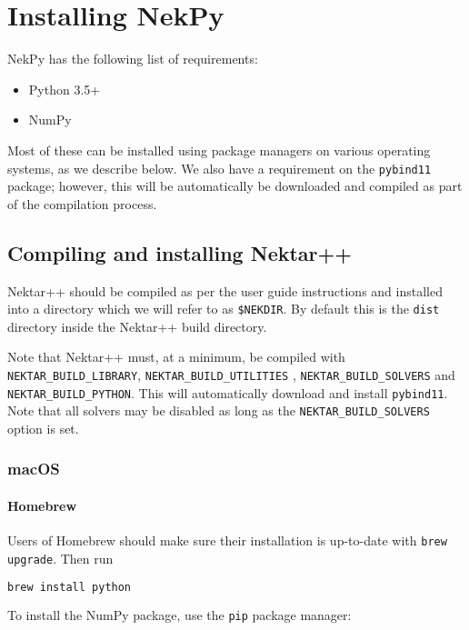 \chapter{Installing NekPy}

NekPy has the following list of requirements:

\begin{itemize}
  \item Python 3.5+
  \item NumPy
\end{itemize}

Most of these can be installed using package managers on various operating
systems, as we describe below. We also have a requirement on the \texttt{pybind11}
package; however, this will be automatically be downloaded and compiled as part
of the compilation process.

\section{Compiling and installing Nektar++}

Nektar++ should be compiled as per the user guide instructions and installed
into a directory which we will refer to as \texttt{\$NEKDIR}. By default this is
the \texttt{dist} directory inside the Nektar++ build directory.

Note that Nektar++ must, at a minimum, be compiled with
\texttt{NEKTAR\_BUILD\_LIBRARY}, \texttt{NEKTAR\_BUILD\_UTILITIES} ,
\texttt{NEKTAR\_BUILD\_SOLVERS} and \texttt{NEKTAR\_BUILD\_PYTHON}.  This will
automatically download and install \texttt{pybind11}. Note that all solvers may
be disabled as long as the \texttt{NEKTAR\_BUILD\_SOLVERS} option is set.

\subsection{macOS}

\subsubsection{Homebrew}

Users of Homebrew should make sure their installation is up-to-date with 
\texttt{brew upgrade}. Then run

\begin{lstlisting}[language=bash]
brew install python
\end{lstlisting}

To install the NumPy package, use the \texttt{pip} package manager:

